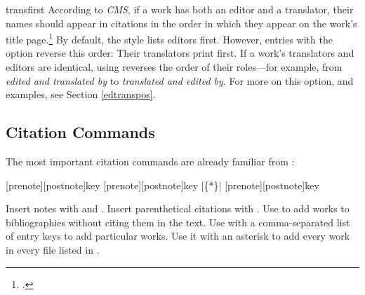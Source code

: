 \documentclass[11pt,letterpaper,oneside]{article}
\begin{document}
\begin{marglist}
\item[transfirst] According to \textit{CMS}, if a work has both an
editor and a translator, their names should appear in citations in the
order in which they appear on the work's title
page.\footcite[14.88]{chicago2010} By default, the style lists editors
first. However, entries with the option  reverse
this order: Their translators print first. If a work's translators and
editors are identical, using  reverses the order
of their roles---for example, from \textit{edited and translated by}
to \textit{translated and edited by}. For more on this option, and
examples, see Section \ref{edtranspos}.

\end{marglist}

\subsection{Citation Commands}
\label{citecmds}

The most important citation commands are already familiar from
\biblatex:

\begin{ltxsyntax}

[prenote][postnote]{key}
[prenote][postnote]{key}
|\{*\}|
[prenote][postnote]{key}

\end{ltxsyntax}

\noindent Insert notes with  and . Insert
parenthetical citations with . Use  to add
works to bibliographies without citing them in the text. Use
 with a comma-separated list of entry keys to add
particular works. Use it with an asterisk to add every work in every
 file listed in .
\end{document}
